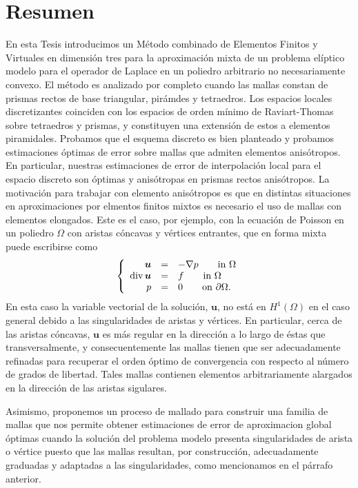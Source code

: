\documentclass[12pt,a4paper,openany,oneside]{book}
\begin{document}
\section*{Resumen}
En esta Tesis introducimos un M\'etodo combinado
de Elementos Finitos y Virtuales en dimensi\'on tres 
para
la aproximaci\'on mixta 
de un problema el\'iptico modelo para el operador
de Laplace en un poliedro arbitrario no necesariamente convexo.
El m\'etodo es analizado por completo
cuando las mallas constan de prismas rectos de base triangular, pir\'amdes y tetraedros. Los espacios locales
discretizantes coinciden con los espacios de orden m\'inimo
de Raviart-Thomas 
sobre tetraedros y prismas, y constituyen una extensi\'on
de estos a elementos piramidales. Probamos que el 
esquema discreto es bien planteado y 
probamos estimaciones \'optimas de error
sobre mallas 
que admiten elementos anis\'otropos. En particular, 
 nuestras estimaciones de 
error
de 
interpolaci\'on 
local 
para el espacio discreto son \'optimas y 
anis\'otropas en prismas rectos anis\'otropos. La motivaci\'on
para trabajar con elemento anis\'otropos es que en
distintas situaciones en aproximaciones por elmentos finitos mixtos
es necesario el uso de mallas con elementos elongados.
Este es el caso, por ejemplo, con la ecuaci\'on de Poisson en un
poliedro $\Omega$ con aristas c\'oncavas y v\'ertices entrantes,
que en forma mixta puede escribirse como
\begin{equation*}\label{mf} \left\{\begin{array}{rcl}
\boldsymbol{u}&=&-\nabla p\qquad \mbox{in }\Omega\\
\mbox{div\,}\boldsymbol{u}&=&f\qquad \mbox{in }\Omega\\
p&=&0\qquad\mbox{on }\partial\Omega.\end{array}\right.
\end{equation*}
En esta caso la variable vectorial de la soluci\'on, $\boldsymbol{u}$,
no est\'a en $H^1(\Omega)$ en el caso general debido a las singularidades 
de aristas y v\'ertices. En particular, cerca de las aristas c\'oncavas,
$\boldsymbol{u}$ es m\'as regular en la direcci\'on a lo largo de \'estas
que transversalmente, y consecuentemente las mallas tienen que ser
adecuadamente refinadas para recuperar el orden \'optimo de convergencia
con respecto al n\'umero de grados de libertad. Tales mallas  contienen
elementos arbitrariamente alargados en la direcci\'on de las aristas sigulares.

Asimismo, proponemos un proceso de mallado
para construir una familia de mallas que nos permite
obtener estimaciones de error de aproximacion global
\'optimas cuando la soluci\'on del problema modelo
presenta singularidades de arista o v\'ertice
puesto que las mallas resultan, por construcci\'on,
adecuadamente gra\-duadas y adaptadas 
a las singularidades, como mencionamos en el p\'arrafo anterior.
\end{document}
